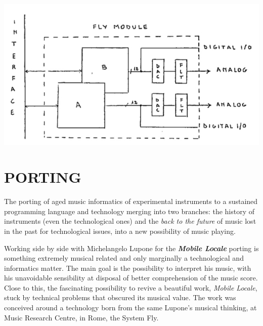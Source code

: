 \documentclass[
	a0,
	portrait
	]{a0poster}
\begin{document}
\begin{multicols}{4}
\begin{center}
\includegraphics[width=1.\linewidth]{lmfly10}
\end{center}

\section*{\color{cbordeaux}PORTING}

The porting of aged music informatics of experimental instruments to a sustained programming language and technology merging into two branches: the history of instruments (even the technological ones) and the \emph{back to the future} of music lost in the past for technological issues, into a new possibility of music playing. 

Working side by side with Michelangelo Lupone for the \emph{\textbf{Mobile Locale}} porting is something extremely musical related and only marginally a technological and informatics matter. The main goal is the possibility to interpret his music, with his unavoidable sensibility at disposal of better comprehension of the music score. Close to this, the fascinating possibility to revive a beautiful work, \emph{Mobile Locale}, stuck by technical problems that obscured its musical value. The work was conceived around a technology born from the same Lupone's musical thinking, at Music Research Centre, in Rome, the System Fly. 



\end{multicols}
\end{document}
